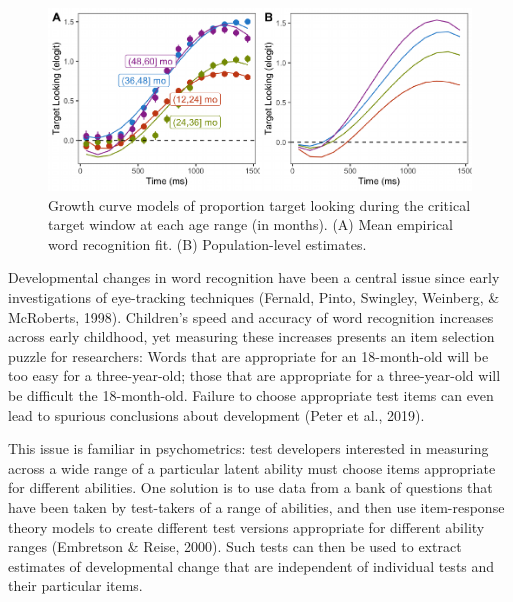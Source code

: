 \documentclass[10pt, letterpaper]{article}
\newenvironment{CodeChunk}{}{}
\begin{document}
\begin{CodeChunk}
\begin{figure}[h]

{\centering \includegraphics{figs/age_gca-1} 

}

\caption[Growth curve models of proportion target looking during the critical target window at each age range (in months)]{Growth curve models of proportion target looking during the critical target window at each age range (in months). (A) Mean empirical word recognition fit. (B) Population-level estimates.}\label{fig:age_gca}
\end{figure}
\end{CodeChunk}

Developmental changes in word recognition have been a central issue
since early investigations of eye-tracking techniques (Fernald, Pinto,
Swingley, Weinberg, \& McRoberts, 1998). Children's speed and accuracy
of word recognition increases across early childhood, yet measuring
these increases presents an item selection puzzle for researchers: Words
that are appropriate for an 18-month-old will be too easy for a
three-year-old; those that are appropriate for a three-year-old will be
difficult the 18-month-old. Failure to choose appropriate test items can
even lead to spurious conclusions about development (Peter et al.,
2019).

This issue is familiar in psychometrics: test developers interested in
measuring across a wide range of a particular latent ability must choose
items appropriate for different abilities. One solution is to use data
from a bank of questions that have been taken by test-takers of a range
of abilities, and then use item-response theory models to create
different test versions appropriate for different ability ranges
(Embretson \& Reise, 2000). Such tests can then be used to extract
estimates of developmental change that are independent of individual
tests and their particular items.
\end{document}
